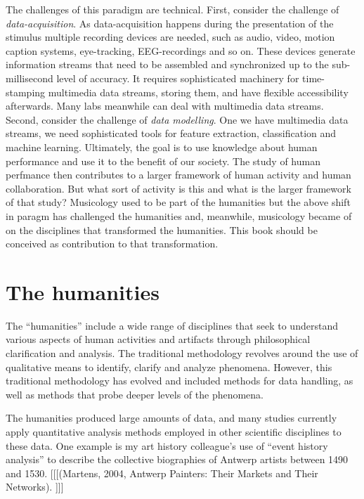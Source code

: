 \documentclass[
]{book}
\theoremstyle{definition}
\theoremstyle{definition}
\theoremstyle{definition}
\theoremstyle{definition}
\theoremstyle{remark}
\begin{document}
The challenges of this paradigm are technical.
First, consider the challenge of \emph{data-acquisition}. As data-acquisition happens during the presentation of the stimulus multiple recording devices are needed, such as audio, video, motion caption systems, eye-tracking, EEG-recordings and so on. These devices generate information streams that need to be assembled and synchronized up to the sub-millisecond level of accuracy. It requires sophisticated machinery for time-stamping multimedia data streams, storing them, and have flexible accessibility afterwards.
Many labs meanwhile can deal with multimedia data streams.
Second, consider the challenge of \emph{data modelling}. One we have multimedia data streams, we need sophisticated tools for feature extraction, classification and machine learning. Ultimately, the goal is to use knowledge about human performance and use it to the benefit of our society. The study of human perfmance then contributes to a larger framework of human activity and human collaboration.
But what sort of activity is this and what is the larger framework of that study?
Musicology used to be part of the humanities but the above shift in paragm has challenged the humanities and, meanwhile, musicology became of on the disciplines that transformed the humanities.
This book should be conceived as contribution to that transformation.

\hypertarget{the-humanities}{%
\section{The humanities}\label{the-humanities}}

The ``humanities'' include a wide range of disciplines that seek to understand various aspects of human activities and artifacts through philosophical clarification and analysis.
The traditional methodology revolves around the use of qualitative means to identify, clarify and analyze phenomena. However, this traditional methodology has evolved and included methods for data handling, as well as methods that probe deeper levels of the phenomena.

The humanities produced large amounts of data, and many studies currently apply quantitative analysis methods employed in other scientific disciplines to these data.
One example is my art history colleague's use of ``event history analysis'' to describe the collective biographies of Antwerp artists between 1490 and 1530.
{[}{[}{[}(Martens, 2004, Antwerp Painters: Their Markets and Their Networks). {]}{]}{]}
\end{document}
